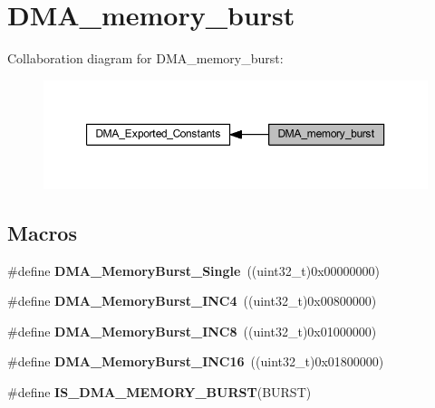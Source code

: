 \hypertarget{group___d_m_a__memory__burst}{}\section{D\+M\+A\+\_\+memory\+\_\+burst}
\label{group___d_m_a__memory__burst}
Collaboration diagram for D\+M\+A\+\_\+memory\+\_\+burst\+:\nopagebreak
\begin{figure}[H]
\begin{center}
\leavevmode
\includegraphics[width=350pt]{group___d_m_a__memory__burst}
\end{center}
\end{figure}
\subsection*{Macros}
\begin{DoxyCompactItemize}
\item 
\mbox{\label{group___d_m_a__memory__burst_gab3353b3a85b555f826fe567ce68c3fc3}} 
\#define {\bfseries D\+M\+A\+\_\+\+Memory\+Burst\+\_\+\+Single}~((uint32\+\_\+t)0x00000000)
\item 
\mbox{\label{group___d_m_a__memory__burst_gacf7f57731c663fdc6ca8a6fb18ff31b0}} 
\#define {\bfseries D\+M\+A\+\_\+\+Memory\+Burst\+\_\+\+I\+N\+C4}~((uint32\+\_\+t)0x00800000)
\item 
\mbox{\label{group___d_m_a__memory__burst_ga33aca825c5a81e83753ff6fadb3634c0}} 
\#define {\bfseries D\+M\+A\+\_\+\+Memory\+Burst\+\_\+\+I\+N\+C8}~((uint32\+\_\+t)0x01000000)
\item 
\mbox{\label{group___d_m_a__memory__burst_ga4ffd4960f794b187229fac1cea3d81c9}} 
\#define {\bfseries D\+M\+A\+\_\+\+Memory\+Burst\+\_\+\+I\+N\+C16}~((uint32\+\_\+t)0x01800000)
\item 
\#define {\bfseries I\+S\+\_\+\+D\+M\+A\+\_\+\+M\+E\+M\+O\+R\+Y\+\_\+\+B\+U\+R\+ST}(B\+U\+R\+ST)
\end{DoxyCompactItemize}


